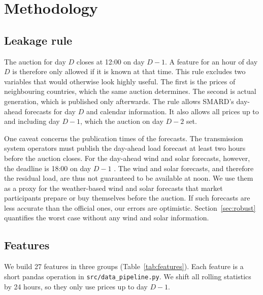 \documentclass[12pt,oneside]{article}
\begin{document}
\section{Methodology} \label{sec:method}

\subsection{Leakage rule} \label{sec:leakage}

The auction for day $D$ closes at 12:00 on day $D-1$. A feature for an hour of day $D$ is therefore only allowed if it is known at that time. This rule excludes two variables that would otherwise look highly useful. The first is the prices of neighbouring countries, which the same auction determines. The second is actual generation, which is published only afterwards. The rule allows SMARD's day-ahead forecasts for day $D$ and calendar information. It also allows all prices up to and including day $D-1$, which the auction on day $D-2$ set.

One caveat concerns the publication times of the forecasts. The transmission system operators must publish the day-ahead load forecast at least two hours before the auction closes. For the day-ahead wind and solar forecasts, however, the deadline is 18:00 on day $D-1$ \citep{eu2013transparency}. The wind and solar forecasts, and therefore the residual load, are thus not guaranteed to be available at noon. We use them as a proxy for the weather-based wind and solar forecasts that market participants prepare or buy themselves before the auction. If such forecasts are less accurate than the official ones, our errors are optimistic. Section~\ref{sec:robust} quantifies the worst case without any wind and solar information.

\subsection{Features}

We build 27 features in three groups (Table~\ref{tab:features}). Each feature is a short pandas operation in \texttt{src/\allowbreak data\_\allowbreak pipeline.py}. We shift all rolling statistics by 24 hours, so they only use prices up to day $D-1$.
\end{document}
